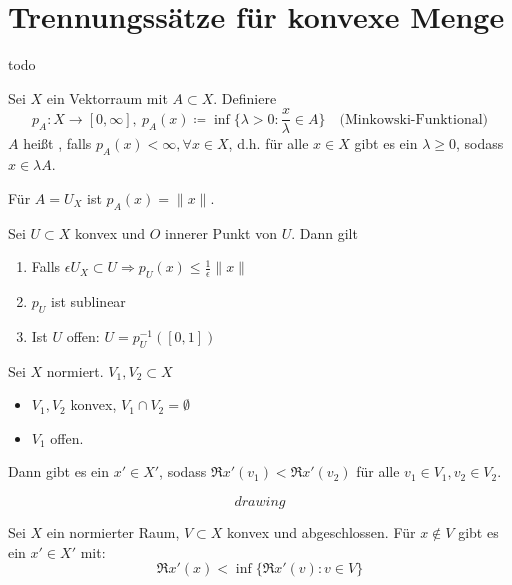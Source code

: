 

\section{Trennungssätze für konvexe Menge}



\begin{motivation}
	todo %
\end{motivation}


\begin{definition}
	Sei $X$ ein Vektorraum mit $A \subset X$. Definiere 
		\[ p_{A} \colon X \rightarrow [0, \infty], ~ p_{A}(x) \coloneqq \inf \{ \lambda > 0 : \frac{x}{\lambda} \in A \} \quad \text{(Minkowski-Funktional)} \]
	$A$ hei{\ss}t , falls $p_{A}(x) < \infty, \forall x \in X$, d.h. für alle $ x \in X$ gibt es ein $\lambda \geq 0$, sodass $x \in \lambda A$.
\end{definition}


\begin{beispiel}
	Für $A = U_{X}$ ist $p_{A}(x) = \| x \|$.	
\end{beispiel}


\begin{prop}
	Sei $U \subset X$ konvex und $O$ innerer Punkt von $U$. Dann gilt
	\begin{enumerate}[label=\alph*\upshape)]
		\item Falls $\epsilon U_{X} \subset U \Rightarrow p_{U}(x) \leq \frac{1}{\epsilon} \| x \|$
		\item $p_{U}$ ist sublinear
		\item Ist $U$ offen: $U = p_{U}^{-1}([0 , 1])$
	\end{enumerate}	
\end{prop}


\begin{satz}[1. Trennungssatz]
	Sei $X$ normiert. $V_{1}, V_{2} \subset X$
	\begin{itemize}
		\item $V_{1}, V_{2}$ konvex, $V_{1} \cap V_{2} = \emptyset$
		\item $V_{1}$ offen.
	\end{itemize}
	Dann gibt es ein $x' \in X'$, sodass $\Re x'(v_{1}) < \Re x'(v_{2})$ für alle $v_{1} \in V_{1}, v_{2} \in V_{2}$.
\end{satz}

	\[
	  drawing %
	\]	


\begin{satz}[2. Trennungssatz]
	Sei $X$ ein normierter Raum, $V \subset X$ konvex und abgeschlossen. Für $x \notin V$ gibt es ein $x' \in X'$ mit:
		\[ \Re x'(x) < \inf \{ \Re x'(v) : v \in V \} \]	
\end{satz}



\newpage
